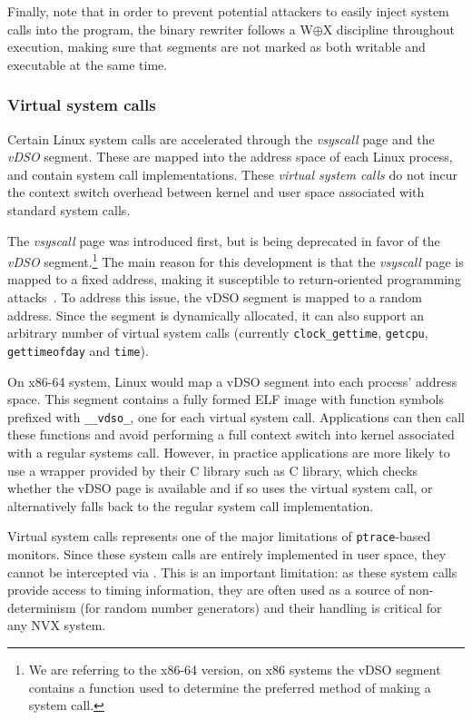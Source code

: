 Finally, note that in order to prevent potential attackers to easily inject
system calls into the program, the binary rewriter follows a
W$\mathbin{\oplus}$X discipline throughout execution, making sure that
segments are not marked as both writable and executable at the same
time.


\subsubsection{Virtual system calls}
\label{sec:vsyscall}

Certain Linux system calls are accelerated through the \emph{vsyscall}
page and the \emph{vDSO} segment. These are mapped into the address
space of each Linux process, and contain system call
implementations. These \textit{virtual system calls} do not incur the
context switch overhead between kernel and user space associated with
standard system calls.

The \emph{vsyscall} page was introduced first, but is being deprecated in favor
of the \emph{vDSO} segment.\footnote{We are referring to the x86-64 version, on x86
systems the vDSO segment contains a function used to determine the preferred
method of making a system call.} The main reason for this development is that
the \emph{vsyscall} page is mapped to a fixed address, making it susceptible to
return-oriented programming attacks~\cite{ROP:tissec12}. To address this issue,
the vDSO segment is mapped to a random address. Since the segment is
dynamically allocated, it can also support an arbitrary number of virtual
system calls (currently \lstinline`clock_gettime`, \lstinline`getcpu`,
\lstinline`gettimeofday` and \lstinline`time`).

On x86-64 system, Linux would map a vDSO segment into each process' address
space. This segment contains a fully formed ELF image with function symbols
prefixed with \lstinline`__vdso_`, one for each virtual system call.
Applications can then call these functions and avoid performing a full context
switch into kernel associated with a regular systems call. However, in practice
applications are more likely to use a wrapper provided by their C library such
as \gnu C library, which checks whether the vDSO page is available and if so
uses the virtual system call, or alternatively falls back to the regular system
call implementation.

Virtual system calls represents one of the major limitations of
\lstinline`ptrace`-based monitors. Since these system calls are entirely
implemented in user space, they cannot be intercepted via \ptrace.
This is an important limitation: as these system calls provide access
to timing information, they are often used as a source of
non-determinism (\eg for random number generators) and their handling
is critical for any NVX system. %

